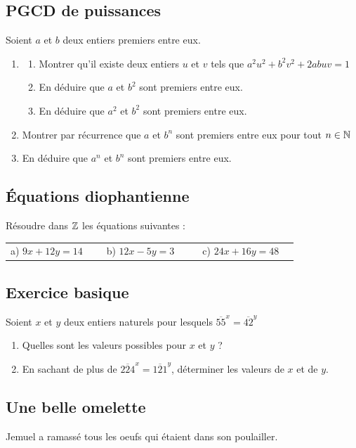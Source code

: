 \documentclass[oneside,12pt]{book}          %
\begin{document}
\subsection{PGCD de puissances}
Soient $a$ et $b$ deux entiers premiers entre eux.
\begin{enumerate}
	\item \begin{enumerate}
			\item Montrer qu'il existe deux entiers $u$ et $v$ tels que $a^2u^2+b^2v^2+2abuv=1$
			\item En déduire que $a$ et $b^2$ sont premiers entre eux.
			\item En déduire que $a^2$ et $b^2$ sont premiers entre eux.
		\end{enumerate}
	\item Montrer par récurrence que $a$ et $b^n$ sont premiers entre eux pour tout ${n\in\mathbb N}$
	\item En déduire que $a^n$ et $b^n$ sont premiers entre eux.
\end{enumerate}



\subsection{Équations diophantienne}
Résoudre dans ${\mathbb Z}$ les équations suivantes :

\begin{tabular}{p{0.3\linewidth} p{0.3\linewidth} p{0.3\linewidth}}
    a) $9x+12y=14$ & b) $12x-5y=3$ & c) $24x+16y=48$
\end{tabular}



\subsection{Exercice basique}
Soient $x$ et $y$ deux entiers naturels pour lesquels $\overline{55}^x=\overline{42}^y$
\begin{enumerate}
	\item Quelles sont les valeurs possibles pour $x$ et $y$ ?
	\item En sachant de plus de $\overline{224}^x=\overline{121}^y$, déterminer les valeurs de $x$ et de $y$.
\end{enumerate}



\subsection{Une belle omelette}
Jemuel a ramassé tous les oeufs qui étaient dans son poulailler.
\end{document}
